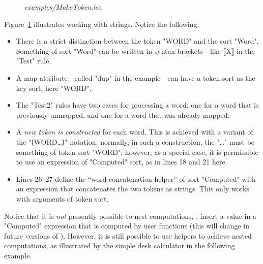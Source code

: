 \documentclass[11pt]{article} %
\newenvironment{figureunit}[1][]{\def\figureunitcaption{#1}}{\figureunitcaption}
\renewenvironment{figureunit}[1][]{\def\thefigureunitcaption{#1}%
  \begin{lrbox}{\savedfigureunit}\begin{minipage}{\linewidth}}%
{\thefigureunitcaption\vspace{1ex}\end{minipage}\end{lrbox}%
  \colorbox{blue!10}{\usebox{\savedfigureunit}}}
\begin{document}
\begin{figure}[t]
  \begin{figureunit}[
      \caption{\emph{examples/MakeToken.hx}.}
      \label{fig:maketoken}
    ]
  \end{figureunit}
\end{figure}

\begin{example}
  Figure~\ref{fig:maketoken} illustrates working with strings. Notice the following:
  \begin{itemize}

  \item There is a strict distinction between the token "WORD" and the sort "Word". Something of
    sort "Word" can be written in syntax brackets---like ⟦X⟧ in the "Test" rule.

  \item A map attribute---called "dup" in the example---can have a token sort as the key sort, here
    "WORD".

  \item The "Test2" rules have two cases for processing a word: one for a word that is previously
    unmapped, and one for a word that was already mapped.

  \item A \emph{new token is constructed} for each word. This is achieved with a variant of the
    "⟨WORD…⟩" notation: normally, in such a construction, the "…" must be something of token sort
    "WORD"; however, as a special case, it is permissible to use an expression of "Computed" sort,
    as in lines 18 and 21 here.

  \item Lines 26--27 define the ``word concatenation helper'' of sort "Computed" with an expression
    that concatenates the two tokens as strings. This only works with arguments of token sort.

  \end{itemize}
\end{example}

Notice that it is \emph{not} presently possible to nest computations, \ie, insert a value in a
"Computed" expression that is computed by user functions (this will change in future versions of
\HAX). However, it is still possible to use helpers to achieve nested computations, as illustrated
by the simple desk calculator in the following example.
\end{document}
